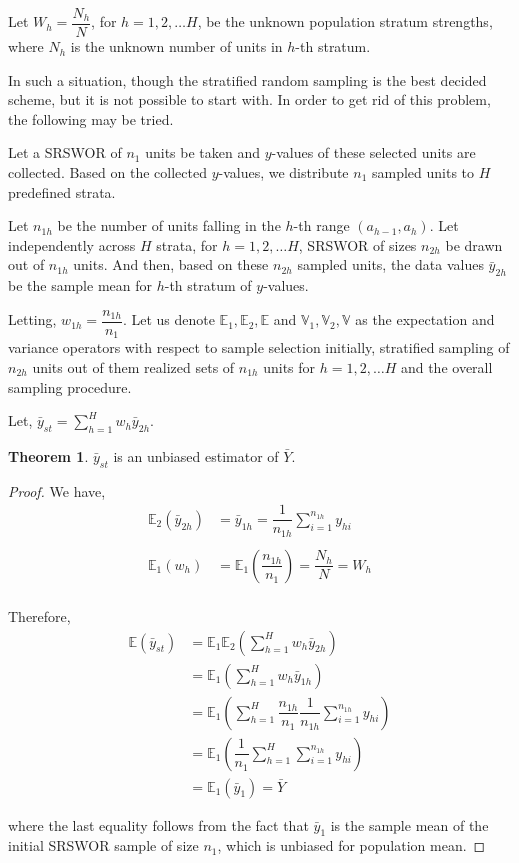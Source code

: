 \documentclass[12pt]{article}
\newcommand{\E}{\mathbb{E}}
\newcommand{\Var}{\mathbb{V}}
\theoremstyle{definition}
\newtheorem{thm}{Theorem}
\newenvironment{theorem}{
\begin{tcolorbox}[colback=green!5!white,colframe=green!75!black, parbox = false]\begin{thm} }{\end{thm}\end{tcolorbox} }
\begin{document}
Let $W_h = \dfrac{N_h}{N}$, for $h = 1, 2, \dots H$, be the unknown population stratum strengths, where $N_h$ is the unknown number of units in $h$-th stratum.

In such a situation, though the stratified random sampling is the best decided scheme, but it is not possible to start with. In order to get rid of this problem, the following may be tried.

Let a SRSWOR of $n_1$ units be taken and $y$-values of these selected units are collected. Based on the collected $y$-values, we distribute $n_1$ sampled units to $H$ predefined strata.

Let $n_{1h}$ be the number of units falling in the $h$-th range $(a_{h-1}, a_h)$. Let independently across $H$ strata, for $h = 1, 2, \dots H$, SRSWOR of sizes $n_{2h}$ be drawn out of $n_{1h}$ units. And then, based on these $n_{2h}$ sampled units, the data values $\bar{y}_{2h}$ be the sample mean for $h$-th stratum of $y$-values.

Letting, $w_{1h} = \dfrac{n_{1h}}{n_1}$. Let us denote $\E_1, \E_2, \E$ and $\Var_1, \Var_2, \Var$ as the expectation and variance operators with respect to sample selection initially, stratified sampling of $n_{2h}$ units out of them realized sets of $n_{1h}$ units for $h = 1, 2, \dots H$ and the overall sampling procedure.

Let, $\bar{y}_{st} = \sum_{h = 1}^{H}w_h \bar{y}_{2h}$.

\begin{theorem}
    $\bar{y}_{st}$ is an unbiased estimator of $\bar{Y}$.
\end{theorem}

\begin{proof}

We have,
\begin{align*}
   \E_2(\bar{y}_{2h}) & = \bar{y}_{1h} = \dfrac{1}{n_{1h}} \sum_{i = 1}^{n_{1h}} y_{hi}\\
   & \\
   \E_1(w_h) & = \E_1\left( \dfrac{n_{1h}}{n_1} \right) = \dfrac{N_h}{N} = W_h\\
\end{align*}

Therefore,
\begin{align*}
    \E(\bar{y}_{st}) & = \E_1 \E_2 \left( \sum_{h = 1}^{H}w_h \bar{y}_{2h} \right)\\
    & = \E_1 \left( \sum_{h = 1}^{H}w_h \bar{y}_{1h} \right)\\
    & = \E_1 \left( \sum_{h = 1}^{H} \dfrac{n_{1h}}{n_1} \dfrac{1}{n_{1h}} \sum_{i = 1}^{n_{1h}} y_{hi} \right)\\
    & = \E_1 \left( \dfrac{1}{n_1} \sum_{h = 1}^{H} \sum_{i = 1}^{n_{1h}} y_{hi} \right)\\
    & = \E_1(\bar{y}_1) = \bar{Y}
\end{align*}

where the last equality follows from the fact that $\bar{y}_1$ is the sample mean of the initial SRSWOR sample of size $n_1$, which is unbiased for population mean.

\end{proof}
\end{document}
